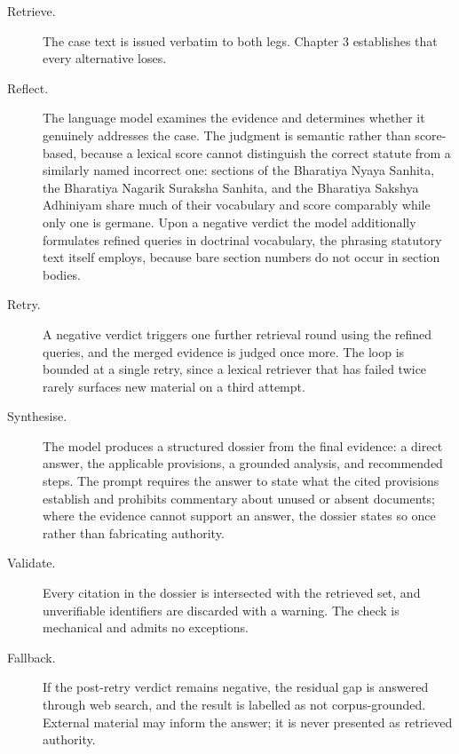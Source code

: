 \documentclass{mnnit}
\begin{document}
\begin{description}
\item[Retrieve.] The case text is issued verbatim to both legs.
  Chapter 3 establishes that every alternative loses.
\item[Reflect.] The language model examines the evidence and
  determines whether it genuinely addresses the case. The
  judgment is semantic rather than score-based, because a lexical
  score cannot distinguish the correct statute from a similarly
  named incorrect one: sections of the Bharatiya Nyaya Sanhita,
  the Bharatiya Nagarik Suraksha Sanhita, and the Bharatiya
  Sakshya Adhiniyam share much of their vocabulary and score
  comparably while only one is germane. Upon a negative verdict
  the model additionally formulates refined queries in doctrinal
  vocabulary, the phrasing statutory text itself employs, because
  bare section numbers do not occur in section bodies.
\item[Retry.] A negative verdict triggers one further retrieval
  round using the refined queries, and the merged evidence is
  judged once more. The loop is bounded at a single retry, since
  a lexical retriever that has failed twice rarely surfaces new
  material on a third attempt.
\item[Synthesise.] The model produces a structured dossier from
  the final evidence: a direct answer, the applicable provisions,
  a grounded analysis, and recommended steps. The prompt requires
  the answer to state what the cited provisions establish and
  prohibits commentary about unused or absent documents; where
  the evidence cannot support an answer, the dossier states so
  once rather than fabricating authority.
\item[Validate.] Every citation in the dossier is intersected
  with the retrieved set, and unverifiable identifiers are
  discarded with a warning. The check is mechanical and admits no
  exceptions.
\item[Fallback.] If the post-retry verdict remains negative, the
  residual gap is answered through web search, and the result is
  labelled as not corpus-grounded. External material may inform
  the answer; it is never presented as retrieved authority.
\end{description}
\end{document}
